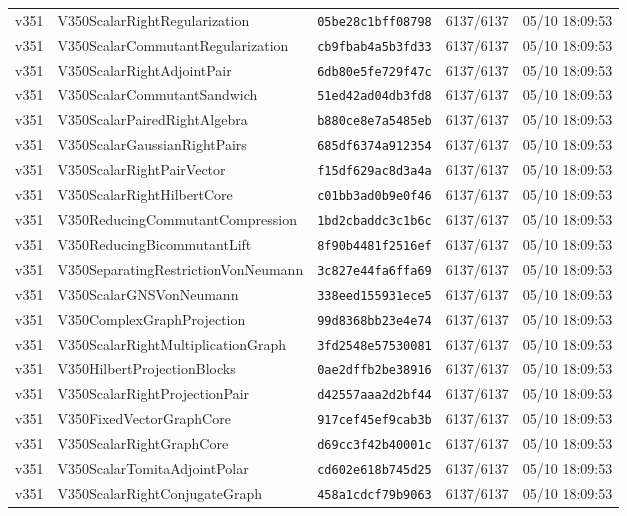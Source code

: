 \documentclass[11pt]{article}
\theoremstyle{definition}\newtheorem{deriv}{Derivation}
\begin{document}
{\begin{longtable}{@{}lllll@{}}
v351 & V350ScalarRightRegularization & \texttt{05be28c1bff08798} & 6137/6137 & 05/10 18:09:53 \\
v351 & V350ScalarCommutantRegularization & \texttt{cb9fbab4a5b3fd33} & 6137/6137 & 05/10 18:09:53 \\
v351 & V350ScalarRightAdjointPair & \texttt{6db80e5fe729f47c} & 6137/6137 & 05/10 18:09:53 \\
v351 & V350ScalarCommutantSandwich & \texttt{51ed42ad04db3fd8} & 6137/6137 & 05/10 18:09:53 \\
v351 & V350ScalarPairedRightAlgebra & \texttt{b880ce8e7a5485eb} & 6137/6137 & 05/10 18:09:53 \\
v351 & V350ScalarGaussianRightPairs & \texttt{685df6374a912354} & 6137/6137 & 05/10 18:09:53 \\
v351 & V350ScalarRightPairVector & \texttt{f15df629ac8d3a4a} & 6137/6137 & 05/10 18:09:53 \\
v351 & V350ScalarRightHilbertCore & \texttt{c01bb3ad0b9e0f46} & 6137/6137 & 05/10 18:09:53 \\
v351 & V350ReducingCommutantCompression & \texttt{1bd2cbaddc3c1b6c} & 6137/6137 & 05/10 18:09:53 \\
v351 & V350ReducingBicommutantLift & \texttt{8f90b4481f2516ef} & 6137/6137 & 05/10 18:09:53 \\
v351 & V350SeparatingRestrictionVonNeumann & \texttt{3c827e44fa6ffa69} & 6137/6137 & 05/10 18:09:53 \\
v351 & V350ScalarGNSVonNeumann & \texttt{338eed155931ece5} & 6137/6137 & 05/10 18:09:53 \\
v351 & V350ComplexGraphProjection & \texttt{99d8368bb23e4e74} & 6137/6137 & 05/10 18:09:53 \\
v351 & V350ScalarRightMultiplicationGraph & \texttt{3fd2548e57530081} & 6137/6137 & 05/10 18:09:53 \\
v351 & V350HilbertProjectionBlocks & \texttt{0ae2dffb2be38916} & 6137/6137 & 05/10 18:09:53 \\
v351 & V350ScalarRightProjectionPair & \texttt{d42557aaa2d2bf44} & 6137/6137 & 05/10 18:09:53 \\
v351 & V350FixedVectorGraphCore & \texttt{917cef45ef9cab3b} & 6137/6137 & 05/10 18:09:53 \\
v351 & V350ScalarRightGraphCore & \texttt{d69cc3f42b40001c} & 6137/6137 & 05/10 18:09:53 \\
v351 & V350ScalarTomitaAdjointPolar & \texttt{cd602e618b745d25} & 6137/6137 & 05/10 18:09:53 \\
v351 & V350ScalarRightConjugateGraph & \texttt{458a1cdcf79b9063} & 6137/6137 & 05/10 18:09:53 \\

\end{longtable}}
\end{document}
